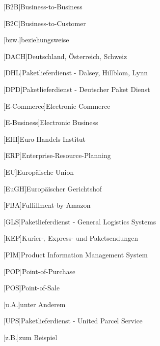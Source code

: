 
\begin{addmargin}[1.5em]{0em}

    \begin{acronym}[HTTPS] %

        [B2B]{Business-to-Business}

        [B2C]{Business-to-Customer}

        [bzw.]{beziehungsweise}

        [DACH]{Deutschland, Österreich, Schweiz}

        [DHL]{Paketlieferdienst - Dalsey, Hillblom, Lynn}

        [DPD]{Paketlieferdienst - Deutscher Paket Dienst}

        [E-Commerce]{Electronic Commerce}

        [E-Business]{Electronic Business}

        [EHI]{Euro Handels Institut}

        [ERP]{Enterprise-Resource-Planning}

        [EU]{Europäische Union}

        [EuGH]{Europäischer Gerichtshof}

        [FBA]{Fulfillment-by-Amazon}

        [GLS]{Paketlieferdienst -  General Logistics Systems}

        [KEP]{Kurier-, Express- und Paketsendungen}

        [PIM]{Product Information Management System}

        [POP]{Point-of-Purchase}

        [POS]{Point-of-Sale}

        [u.A.]{unter Anderem}

        [UPS]{Paketlieferdienst -  United Parcel Service}

        [z.B.]{zum Beispiel}

    \end{acronym}

\end{addmargin}